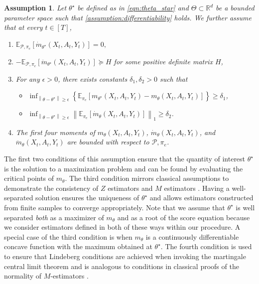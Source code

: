 \documentclass[11pt]{article}
\newcommand{\E}{\mathbb{E}}
\newcommand{\R}{\mathbb{R}}
\newcommand{\norm}[1]{\left\lVert#1\right\rVert}
\newtheorem{assumption}{Assumption}
\begin{document}
\begin{assumption} \label{assumption:maximum}
Let $\theta^{\star}$ be defined as in \cref{eqn:theta_star} and $\Theta \subset \R^{d}$ be a bounded parameter space such that \cref{assumption:differentiability} holds. We further assume that at every $t \in [T]$,
\begin{enumerate}
\item $\E_{\mathcal{P},\pi_{e}}\left[ \dot{m}_{\theta^{\star}}(X_{t},A_{t},Y_{t})\right] =0,$  
\item $-\E_{\mathcal{P},\pi_{e}}\left[ \ddot{m}_{\theta^{\star}}(X_{t},A_{t},Y_{t}) \right] \succeq H  $ for some positive definite matrix $H$,
\item For any $\epsilon> 0 $, there exists constants $\delta_1,\delta_2 > 0 $ such that 
\begin{itemize}
    \item $\inf_{\norm{\theta- \theta^{\star}} \ge \epsilon} \left\{ \mathbb{E}_{\pi_{e}}\left[ m_{\theta^{\star}}(X_{t},A_t,Y_t) - m_{\theta}(X_{t},A_t,Y_t) \right]  \right\} \ge \delta_1$,
    \item  $\inf_{\norm{\theta- \theta^{\star}} \ge \epsilon} \norm{\mathbb{E}_{\pi_{e}}\left[\dot{m}_{\theta}(X_{t},A_t,Y_t)\right]}_{1}  \ge \delta_2$.
\end{itemize}
\item The first four moments of $m_{\theta}(X_t,A_t,Y_t)$,  $\dot{m}_{\theta}(X_t,A_t,Y_t)$, and $\ddot{m}_{\theta}(X_t,A_t,Y_t)$ are bounded with respect to $\mathcal{P},\pi_{e}$. 
\end{enumerate}
\end{assumption}
The first two conditions of this assumption ensure that the quantity of interest $\theta^{\star}$ is the solution to a maximization problem and can be found by evaluating the critical points of $m_{\theta}$. The third condition mirrors classical assumptions to demonstrate the consistency of $Z$ estimators and $M$ estimators \citep{van2000asymptotic}. Having a well-separated solution ensures the uniqueness of $\theta^{\star}$ and allows estimators constructed from finite samples to converge appropriately. Note that we assume that $\theta^{\star}$ is well separated \emph{both} as a maximizer of $m_{\theta}$ and as a root of the score equation because we consider estimators defined in both of these ways within our procedure. A special case of the third condition is when $m_{\theta}$ is a continuously differentiable concave function with the maximum obtained at $\theta^{\star}$. The fourth condition is used to ensure that Lindeberg conditions are achieved when invoking the martingale central limit theorem and is analogous to conditions in classical proofs of the normality of $M$-estimators \citep{van2000asymptotic}. 
\end{document}
